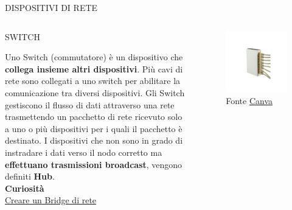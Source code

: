 \documentclass[aspectratio=1610,handout]{beamer}
\begin{document}
\begin{frame}{DISPOSITIVI DI RETE}
    \begin{columns}
            \justifying
            \begin{alertblock}{SWITCH}
                \begin{minipage}{0.96\linewidth}
                    \justifying
                    Uno Switch (commutatore) è un dispositivo che \textbf{collega insieme altri dispositivi}. 
                    Più cavi di rete sono collegati a uno switch per abilitare la comunicazione 
                    tra diversi dispositivi. Gli Switch gestiscono il flusso di dati attraverso 
                    una rete trasmettendo un pacchetto di rete ricevuto solo a uno o più 
                    dispositivi per i quali il pacchetto è destinato. I dispositivi che non sono in grado 
                    di instradare i dati verso il nodo corretto ma \textbf{effettuano trasmissioni broadcast}, 
                    vengono definiti \textbf{Hub}.\\
                    \bigskip
                    \tiny{\textbf{Curiosità}}\\
                    \tiny{\href{https://www.fastweb.it/fastweb-plus/digital-magazine/cos-e-un-bridge-di-rete-e-come-crearne-uno/}{Creare un Bridge di rete}}
                \end{minipage}
            \end{alertblock}
            \begin{figure}
                \includegraphics[width=\linewidth]{img/hubbridgeswitch.png}
                \caption{{Fonte \href{https://www.canva.com/}{Canva}}}
            \end{figure}
    \end{columns}
\end{frame}
\end{document}
